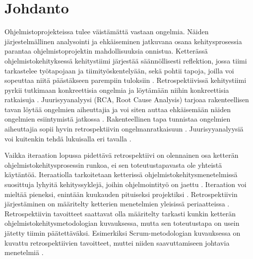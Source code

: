 
\section{Johdanto}

Ohjelmistoprojekteissa tulee väistämättä vastaan ongelmia. Näiden järjestelmällinen analysointi ja ehkäiseminen jatkuvana osana kehitysprosessia parantaa ohjelmistoprojektin mahdollisuuksia onnistua. Ketterässä ohjelmistokehityksessä kehitystiimi järjestää säännöllisesti reflektion, jossa tiimi tarkastelee työtapojaan ja tiimityöskentelyään, sekä pohtii tapoja, joilla voi sopeuttaa niitä päästäkseen parempiin tuloksiin \citep{AgileRetros2006}. Retrospektiivissä kehitystiimi pyrkii tutkimaan konkreettisia ongelmia ja löytämään niihin konkreettisia ratkaisuja \citep{AgileRetros2006}. Juurisyyanalyysi (RCA, Root Cause Analysis) tarjoaa rakenteellisen tavan löytää ongelmien aiheuttajia ja voi siten auttaa ehkäisemään näiden ongelmien esiintymistä jatkossa \citep{Lehtinen2011}. Rakenteellinen tapa tunnistaa ongelmien aiheuttajia sopii hyvin retrospektiivin ongelmanratkaisuun \citep{Lehtinen2013}. Juurisyyanalyysiä voi kuitenkin tehdä lukuisalla eri tavalla \citep{Lehtinen2011}.

Vaikka iteraation lopussa pidettävä retrospektiivi on olennainen osa ketterän ohjelmistokehitysprosessin runkoa, ei sen toteutustapavasta ole yhteistä käytäntöä. Iteraatiolla tarkoitetaan ketterissä ohjelmistokehitysmenetelmissä suosittuja lyhyitä kehityssyklejä, joihin ohjelmointityö on jaettu \citep{beck1999embracing}. Iteraation voi mieltää pieneksi, enintään kuukauden pituiseksi projektiksi \citep{ScrumGuide2011}. Retrospektiivin järjestäminen on määritelty ketterien menetelmien yleisissä periaatteissa \citep{AgileManifestoPrinciples}. Retrospektiivin tavoitteet saattavat olla määritelty tarkasti kunkin ketterän ohjelmistokehitysmetodologian kuvauksessa, mutta sen toteutustapa on usein jätetty tiimin päätettäväksi. Esimerkiksi Scrum-metodologian kuvauksessa on kuvattu retrospektiivien tavoitteet, muttei niiden saavuttamiseen johtavia menetelmiä \citep{ScrumGuide2011}.

